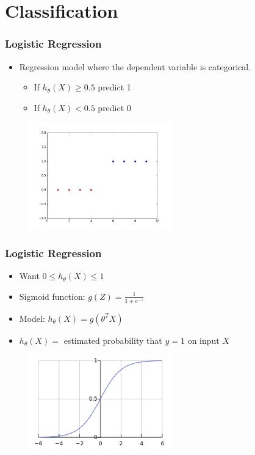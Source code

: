 \documentclass{beamer}
\begin{document}
\section{Classification}
\begin{frame}
	\frametitle{Logistic Regression}
	\begin{itemize}
		\item Regression model where the dependent variable is categorical.
		\begin{itemize}
			\item If $h_{\theta}(X) \geq 0.5$ predict 1
			\item If $h_{\theta}(X) < 0.5$ predict 0
		\end{itemize}
	\end{itemize}
	\begin{figure}
		\centering
		\includegraphics[keepaspectratio, width=0.55\textwidth]{graphics/logisticRegression00}
	\end{figure}
\end{frame}

\begin{frame}
	\frametitle{Logistic Regression}
	\begin{itemize}
		\item Want $0 \leq h_{\theta}(X) \leq 1$
		\item Sigmoid function: $g(Z) = \frac{1}{1+e^{-z}}$
		\item Model: $h_{\theta}(X) = g(\theta^{T}X)$
		\item $h_{\theta}(X)=$ estimated probability that $y=1$ on input $X$
	\end{itemize}
	\begin{figure}
		\centering
		\includegraphics[keepaspectratio, width=0.55\textwidth]{graphics/sigmoid}
	\end{figure}
\end{frame}
\end{document}
